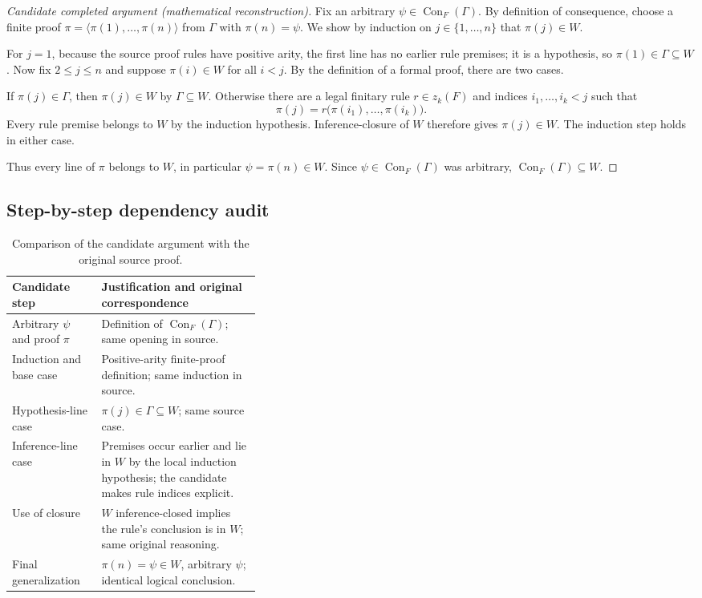 \documentclass[11pt,letterpaper]{article}
\newcommand{\Con}{\operatorname{Con}}
\begin{document}
\begin{proof}[Candidate completed argument (mathematical reconstruction)]
Fix an arbitrary $\psi\in\Con_F(\Gamma)$. By definition of consequence, choose a finite proof $\pi=\langle\pi(1),\ldots,\pi(n)\rangle$ from $\Gamma$ with $\pi(n)=\psi$. We show by induction on $j\in\{1,\ldots,n\}$ that $\pi(j)\in W$.

For $j=1$, because the source proof rules have positive arity, the first line has no earlier rule premises; it is a hypothesis, so $\pi(1)\in\Gamma\subseteq W$. Now fix $2\le j\le n$ and suppose $\pi(i)\in W$ for all $i<j$. By the definition of a formal proof, there are two cases.

If $\pi(j)\in\Gamma$, then $\pi(j)\in W$ by $\Gamma\subseteq W$. Otherwise there are a legal finitary rule $r\in z_k(F)$ and indices $i_1,\ldots,i_k<j$ such that
\[
\pi(j)=r\bigl(\pi(i_1),\ldots,\pi(i_k)\bigr).
\]
Every rule premise belongs to $W$ by the induction hypothesis. Inference-closure of $W$ therefore gives $\pi(j)\in W$. The induction step holds in either case.

Thus every line of $\pi$ belongs to $W$, in particular $\psi=\pi(n)\in W$. Since $\psi\in\Con_F(\Gamma)$ was arbitrary, $\Con_F(\Gamma)\subseteq W$.
\end{proof}

\subsection{Step-by-step dependency audit}
\begin{table}[htbp]\centering\small
\begin{tabularx}{\linewidth}{@{}p{0.36\linewidth}X@{}}\toprule
\textbf{Candidate step} & \textbf{Justification and original correspondence}\\\midrule
Arbitrary $\psi$ and proof $\pi$ & Definition of $\Con_F(\Gamma)$; same opening in source.\\
Induction and base case & Positive-arity finite-proof definition; same induction in source.\\
Hypothesis-line case & $\pi(j)\in\Gamma\subseteq W$; same source case.\\
Inference-line case & Premises occur earlier and lie in $W$ by the local induction hypothesis; the candidate makes rule indices explicit.\\
Use of closure & $W$ inference-closed implies the rule's conclusion is in $W$; same original reasoning.\\
Final generalization & $\pi(n)=\psi\in W$, arbitrary $\psi$; identical logical conclusion.\\\bottomrule
\end{tabularx}
\caption{Comparison of the candidate argument with the original source proof.}
\end{table}
\end{document}
